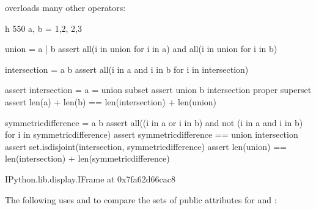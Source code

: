 \documentclass[letterpaper,10pt,english]{sphinxmanual}
\begin{document}
 overloads many other operators:

\begin{sphinxVerbatim}[commandchars=\\\{\}]
 \PYGZhy{}h 550
a, b = \PYGZob{}1,2\PYGZcb{}, \PYGZob{}2,3\PYGZcb{}

union = a | b
assert all(i in union for i in a) and all(i in union for i in b)

intersection = a \PYGZam{} b
assert all(i in a and i in b for i in intersection)

assert intersection \PYGZlt{}= a \PYGZlt{}= union  \PYGZsh{} subset
assert union \PYGZgt{} b \PYGZgt{} intersection    \PYGZsh{} proper superset
assert len(a) + len(b) == len(intersection) + len(union) 

symmetric\PYGZus{}difference = a \PYGZca{} b
assert all((i in a or i in b) and not (i in a and i in b) 
           for i in symmetric\PYGZus{}difference)
assert symmetric\PYGZus{}difference == union \PYGZhy{} intersection
assert set.isdisjoint(intersection, symmetric\PYGZus{}difference)
assert len(union) == len(intersection) + len(symmetric\PYGZus{}difference)
\end{sphinxVerbatim}

\begin{sphinxVerbatim}[commandchars=\\\{\}]
\PYGZlt{}IPython.lib.display.IFrame at 0x7fa62d66cac8\PYGZgt{}
\end{sphinxVerbatim}

The following uses \sphinxcode{\sphinxupquote{\&}} and \sphinxcode{\sphinxupquote{\sphinxhyphen{}}} to compare the sets of public attributes for  and :
\end{document}
